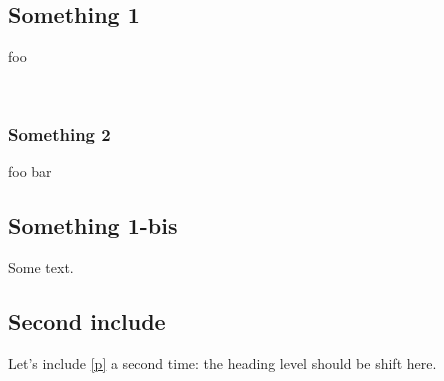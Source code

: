  \hyperref[container-page-test+u+package+++ml-module-Include+u+sections-module-type-Something]{}\label{container-page-test+u+package+++ml-module-Include+u+sections-val-something}\\
\subsection{Something 1\label{something-1}}%
\begin{flushleft}\end{flushleft}%
foo

\label{container-page-test+u+package+++ml-module-Include+u+sections-val-foo}\\
\subsubsection{Something 2\label{something-2}}%
\label{container-page-test+u+package+++ml-module-Include+u+sections-val-bar}\begin{ocamlindent}\begin{flushleft}\end{flushleft}%
foo bar\end{ocamlindent}%
\medbreak
\subsection{Something 1-bis\label{something-1-bis}}%
\begin{flushleft}\end{flushleft}%
Some text.

\subsection{Second include\label{second-include}}%
\begin{flushleft}\end{flushleft}%
Let's include \hyperref[container-page-test+u+package+++ml-module-Include+u+sections-module-type-Something]{[p\pageref*{container-page-test+u+package+++ml-module-Include+u+sections-module-type-Something}]} a second time: the heading level should be shift here.

 \hyperref[container-page-test+u+package+++ml-module-Include+u+sections-module-type-Something]{}\label{container-page-test+u+package+++ml-module-Include+u+sections-val-something}\\
